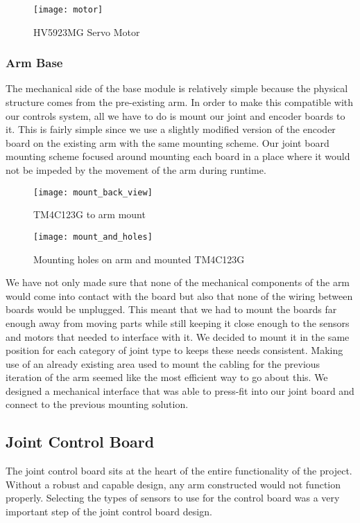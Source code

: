 \begin{figure}[H]
	\centering
	\texttt{[image: motor]}
	\caption{HV5923MG Servo Motor}
	\label{fig:HV5923MG Servo Motor}
\end{figure}


\subsubsection{Arm Base}
The mechanical side of the base module is relatively simple because the physical structure comes from the pre-existing arm. In order to make this compatible with our controls system, all we have to do is mount our joint and encoder boards to it. This is fairly simple since we use a slightly modified version of the encoder board on the existing arm with the same mounting scheme. Our joint board mounting scheme focused around mounting each board in a place where it would not be impeded by the movement of the arm during runtime. 

\begin{figure}[H]
	\centering
	\texttt{[image: mount\_back\_view]}
	\caption{TM4C123G to arm mount}
	\label{fig:mount_back_view}
\end{figure}

\begin{figure}[H]
	\centering
	\texttt{[image: mount\_and\_holes]}
	\caption{Mounting holes on arm and mounted TM4C123G}
	\label{fig:mount_and_holes}
\end{figure}

\noindent We have not only made sure that none of the mechanical components of the arm would come into contact with the board but also that none of the wiring between boards would be unplugged. This meant that we had to mount the boards far enough away from moving parts while still keeping it close enough to the sensors and motors that needed to interface with it. We decided to mount it in the same position for each category of joint type to keeps these needs consistent. Making use of an already existing area used to mount the cabling for the previous iteration of the arm seemed like the most efficient way to go about this. We designed a mechanical interface that was able to press-fit into our joint board and connect to the previous mounting solution.


\subsection{Joint Control Board}
The joint control board sits at the heart of the entire functionality of the project. Without a robust and capable design, any arm constructed would not function properly. Selecting the types of sensors to use for the control board was a very important step of the joint control board design. %

